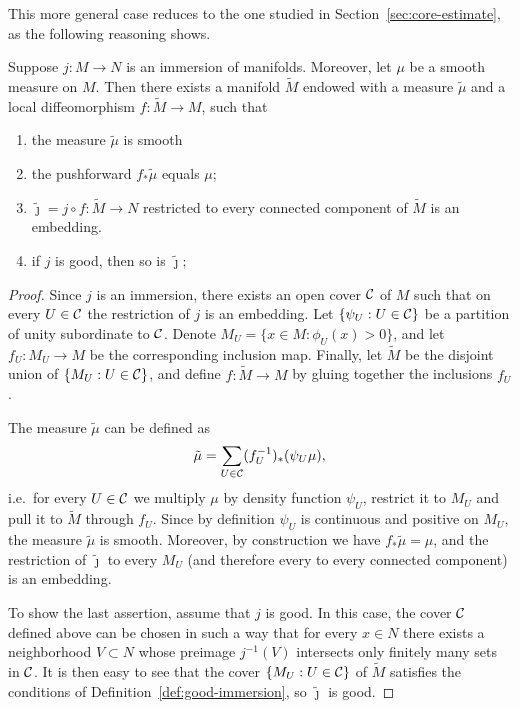 This more general case reduces to the one studied in Section~\ref{sec:core-estimate}, as the following reasoning shows.

\begin{proposition}
\label{prop:resolution-of-intersections}
    Suppose $j\colon M\to N$ is an immersion of manifolds. Moreover, let $\mu$ be a smooth measure on $M$. Then there exists a manifold $\tilde{M}$ endowed with a measure $\tilde{\mu}$ and a local diffeomorphism $f\colon\tilde{M}\to M$, such that 
    \begin{enumerate}
        \item the measure $\tilde{\mu}$ is smooth
        \item the pushforward $f_*\tilde{\mu}$ equals $\mu$;
        \item $\tilde\jmath = j\circ f\colon \tilde{M}\to N$ restricted to every connected component of $\tilde{M}$ is an embedding.
        \item if $j$ is good, then so is $\tilde\jmath$;

    \end{enumerate}    
\end{proposition}

\begin{proof}
    Since $j$ is an immersion, there exists an open cover $\mathcal{C}$ of $M$ such that on every $U\in\mathcal{C}$ the restriction of $j$ is an embedding. Let $\{\psi_U : U\in\mathcal{C}\}$ be a partition of unity subordinate to $\mathcal{C}$. Denote $M_U = \{x\in M : \phi_U(x) > 0\}$, and let $f_U\colon M_U\to M$ be the corresponding inclusion map. Finally, let $\tilde{M}$ be the disjoint union of $\{M_U : U\in\mathcal{C}\}$, and define $f\colon \tilde{M}\to M$ by gluing together the inclusions $f_U$.
    
    The measure $\tilde{\mu}$ can be defined as
    \begin{equation}
        \tilde{\mu} = \sum_{U\in\mathcal{C}} (f_U^{-1})_*(\psi_U \mu),
    \end{equation}
    i.e.\ for every $U\in\mathcal{C}$ we multiply $\mu$ by density function $\psi_U$, restrict it to $M_U$ and pull it to $\tilde{M}$ through $f_U$. Since by definition $\psi_U$ is continuous and positive on $M_U$, the measure $\tilde{\mu}$ is smooth. Moreover, by construction we have $f_*\tilde{\mu} = \mu$,     and the restriction of $\tilde\jmath$ to every $M_U$ (and therefore every to every connected component) is an embedding.

    To show the last assertion, assume that $j$ is good. In this case, the cover $\mathcal{C}$ defined above can be chosen in such a way that for every $x\in N$ there exists a neighborhood $V\subset N$ whose preimage $j^{-1}(V)$ intersects only finitely many sets in $\mathcal{C}$. It is then easy to see that the cover $\{M_U : U\in\mathcal{C}\}$ of $\tilde{M}$ satisfies the conditions of Definition~\ref{def:good-immersion}, so $\tilde\jmath$ is good.
\end{proof}

